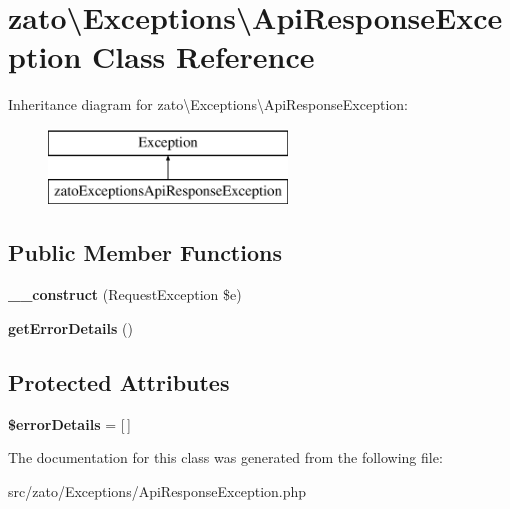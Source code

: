 \hypertarget{classzato_1_1_exceptions_1_1_api_response_exception}{}\section{zato\textbackslash{}Exceptions\textbackslash{}Api\+Response\+Exception Class Reference}
\label{classzato_1_1_exceptions_1_1_api_response_exception}
Inheritance diagram for zato\textbackslash{}Exceptions\textbackslash{}Api\+Response\+Exception\+:\begin{figure}[H]
\begin{center}
\leavevmode
\includegraphics[height=2.000000cm]{classzato_1_1_exceptions_1_1_api_response_exception}
\end{center}
\end{figure}
\subsection*{Public Member Functions}
\begin{DoxyCompactItemize}
\item 
\hypertarget{classzato_1_1_exceptions_1_1_api_response_exception_a5dd842976151781e2459cf1d91453c2c}{}{\bfseries \+\_\+\+\_\+construct} (Request\+Exception \$e)\label{classzato_1_1_exceptions_1_1_api_response_exception_a5dd842976151781e2459cf1d91453c2c}

\item 
\hypertarget{classzato_1_1_exceptions_1_1_api_response_exception_a512812fe54b1ef915ab73f34c9b6ba03}{}{\bfseries get\+Error\+Details} ()\label{classzato_1_1_exceptions_1_1_api_response_exception_a512812fe54b1ef915ab73f34c9b6ba03}

\end{DoxyCompactItemize}
\subsection*{Protected Attributes}
\begin{DoxyCompactItemize}
\item 
\hypertarget{classzato_1_1_exceptions_1_1_api_response_exception_a471c7b012a2c77c1503085663c13732e}{}{\bfseries \$error\+Details} = \mbox{[}$\,$\mbox{]}\label{classzato_1_1_exceptions_1_1_api_response_exception_a471c7b012a2c77c1503085663c13732e}

\end{DoxyCompactItemize}


The documentation for this class was generated from the following file\+:\begin{DoxyCompactItemize}
\item 
src/zato/\+Exceptions/Api\+Response\+Exception.\+php\end{DoxyCompactItemize}
